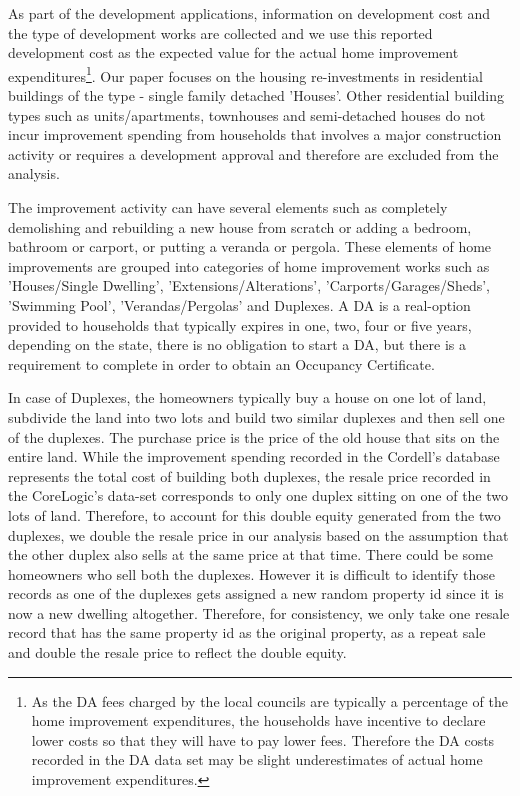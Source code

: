 \documentclass[AEJ,reqno, draftmode]{AEA} %
\begin{document}
As part of the development applications, information on development cost and the type of development works are collected and we use this reported development cost as the expected value for the actual home improvement expenditures\footnote{As the DA fees charged by the local councils are typically a percentage of the home improvement expenditures, the households have incentive to declare lower costs so that they will have to pay lower fees. Therefore the DA costs recorded in the DA data set may be slight underestimates of actual home improvement expenditures.}. Our paper focuses on the housing re-investments in residential buildings of the type - single family detached 'Houses'. Other residential building types such as units/apartments, townhouses and semi-detached houses do not incur improvement spending from households that involves a major construction activity or requires a development approval and therefore are excluded from the analysis.

The improvement activity can have several elements such as completely demolishing and rebuilding a new house from scratch or adding a bedroom, bathroom or carport, or putting a veranda or pergola. These elements of home improvements are grouped into categories of home improvement works such as 'Houses/Single Dwelling', 'Extensions/Alterations', 'Carports/Garages/Sheds', 'Swimming Pool', 'Verandas/Pergolas' and Duplexes. A DA is a real-option provided to households that typically expires in one, two, four or five years, depending on the state, there is no obligation to start a DA, but there is a requirement to complete in order to obtain an Occupancy Certificate. 

In case of Duplexes, the homeowners typically buy a house on one lot of land, subdivide the land into two lots and build two similar duplexes and then sell one of the duplexes. The purchase price is the price of the old house that sits on the entire land. While the improvement spending recorded in the Cordell's database represents the total cost of building both duplexes, the resale price recorded in the CoreLogic's data-set corresponds to only one duplex sitting on one of the two lots of land. Therefore, to account for this double equity generated from the two duplexes, we double the resale price in our analysis based on the assumption that the other duplex also sells at the same price at that time. There could be some homeowners who sell both the duplexes. However it is difficult to identify those records as one of the duplexes gets assigned a new random property id since it is now a new dwelling altogether. Therefore, for consistency, we only take one resale record that has the same property id as the original property, as a repeat sale and double the resale price to reflect the double equity.
\end{document}
